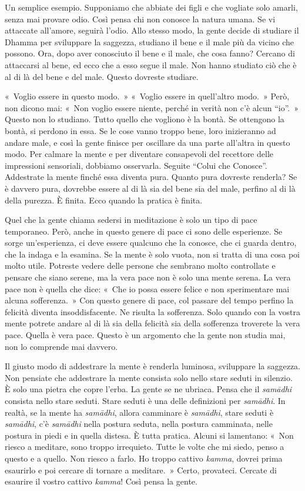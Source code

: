 Un semplice esempio. Supponiamo che abbiate dei figli e che vogliate
solo amarli, senza mai provare odio. Così pensa chi non conosce la
natura umana. Se vi attaccate all'amore, seguirà l'odio. Allo stesso
modo, la gente decide di studiare il Dhamma per sviluppare la saggezza,
studiano il bene e il male più da vicino che possono. Ora, dopo aver
conosciuto il bene e il male, che cosa fanno? Cercano di attaccarsi al
bene, ed ecco che a esso segue il male. Non hanno studiato ciò che è al
di là del bene e del male. Questo dovreste studiare.

«~Voglio essere in questo modo.~» «~Voglio essere in quell'altro modo.~»
Però, non dicono mai: «~Non voglio essere niente, perché in verità non
c'è alcun ``io''.~» Questo non lo studiano. Tutto quello che vogliono è
la bontà. Se ottengono la bontà, si perdono in essa. Se le cose vanno
troppo bene, loro inizieranno ad andare male, e così la gente finisce
per oscillare da una parte all'altra in questo modo. Per calmare la
mente e per diventare consapevoli del recettore delle impressioni
sensoriali, dobbiamo osservarla. Seguite ``Colui che Conosce''.
Addestrate la mente finché essa diventa pura. Quanto pura dovreste
renderla? Se è davvero pura, dovrebbe essere al di là sia del bene sia
del male, perfino al di là della purezza. È finita. Ecco quando la
pratica è finita.

Quel che la gente chiama sedersi in meditazione è solo un tipo di pace
temporaneo. Però, anche in questo genere di pace ci sono delle
esperienze. Se sorge un'esperienza, ci deve essere qualcuno che la
conosce, che ci guarda dentro, che la indaga e la esamina. Se la mente è
solo vuota, non si tratta di una cosa poi molto utile. Potreste vedere
delle persone che sembrano molto controllate e pensare che siano serene,
ma la vera pace non è solo una mente serena. La vera pace non è quella
che dice: «~Che io possa essere felice e non sperimentare mai alcuna
sofferenza.~» Con questo genere di pace, col passare del tempo perfino
la felicità diventa insoddisfacente. Ne risulta la sofferenza. Solo
quando con la vostra mente potrete andare al di là sia della felicità
sia della sofferenza troverete la vera pace. Quella è vera pace. Questo
è un argomento che la gente non studia mai, non lo comprende mai
davvero.

Il giusto modo di addestrare la mente è renderla luminosa, sviluppare la
saggezza. Non pensiate che addestrare la mente consista solo nello stare
seduti in silenzio. È solo una pietra che copre l'erba. La gente se ne
ubriaca. Pensa che il \emph{samādhi} consista nello stare seduti. Stare
seduti è una delle definizioni per \emph{samādhi}. In realtà, se la
mente ha \emph{samādhi}, allora camminare è \emph{samādhi}, stare seduti
è \emph{samādhi}, c'è \emph{samādhi} nella postura seduta, nella postura
camminata, nelle postura in piedi e in quella distesa. È tutta pratica.
Alcuni si lamentano: «~Non riesco a meditare, sono troppo irrequieto.
Tutte le volte che mi siedo, penso a questo e a quello. Non riesco a
farlo. Ho troppo cattivo \emph{kamma}, dovrei prima esaurirlo e poi
cercare di tornare a meditare.~» Certo, provateci. Cercate di esaurire
il vostro cattivo \emph{kamma}! Così pensa la gente.

